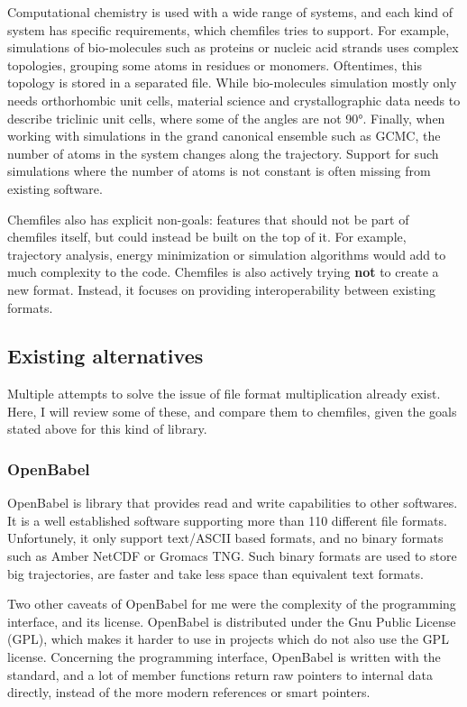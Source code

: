 \documentclass[thesis]{subfiles}
\begin{document}
Computational chemistry is used with a wide range of systems, and each kind of
system has specific requirements, which chemfiles tries to support. For
example, simulations of bio-molecules such as proteins or nucleic acid strands
uses complex topologies, grouping some atoms in residues or monomers.
Oftentimes, this topology is stored in a separated file. While bio-molecules
simulation mostly only needs orthorhombic unit cells, material science and
crystallographic data needs to describe triclinic unit cells, where some of the
angles are not 90°. Finally, when working with simulations in the grand
canonical ensemble such as GCMC, the number of atoms in the system changes along
the trajectory. Support for such simulations where the number of atoms is not
constant is often missing from existing software.

Chemfiles also has explicit non-goals: features that should not be part of
chemfiles itself, but could instead be built on the top of it. For example,
trajectory analysis, energy minimization or simulation algorithms would add to
much complexity to the code. Chemfiles is also actively trying \textbf{not} to
create a new format. Instead, it focuses on providing interoperability between
existing formats.

\subsection{Existing alternatives}

Multiple attempts to solve the issue of file format multiplication already
exist. Here, I will review some of these, and compare them to chemfiles,
given the goals stated above for this kind of library.

\subsubsection{OpenBabel}

OpenBabel\cite{OBoyle2011} is \cxx library that provides read and write
capabilities to other softwares. It is a well established software supporting
more than 110 different file formats. Unfortunely, it only support text/ASCII
based formats, and no binary formats such as Amber NetCDF or Gromacs TNG. Such
binary formats are used to store big trajectories, are faster and take less
space than equivalent text formats.

Two other caveats of OpenBabel for me were the complexity of the programming
interface, and its license. OpenBabel is distributed under the Gnu Public
License (GPL), which makes it harder to use in projects which do not also use
the GPL license. Concerning the programming interface, OpenBabel is written with
the  standard, and a lot of member functions return raw pointers to
internal data directly, instead of the more modern references or smart pointers.
\end{document}

